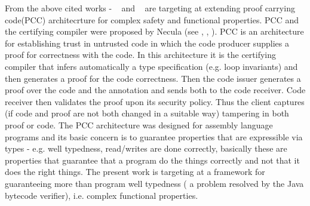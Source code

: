 From the above cited works - ~\cite{WildmoserN-ESOP05} and ~\cite{BM05plb} are targeting at extending proof carrying code(PCC) architecrture for complex safety and functional properties. PCC and the certifying compiler were proposed by Necula (see \cite{Necula97}, \cite{ComNec}, \cite{DesNecLee98}). PCC is an architecture for establishing trust in untrusted code in which the code producer supplies a proof for correctness with the code. In this architecture it is the certifying compiler that infers automatically a type specification (e.g. loop invariants) and then generates a proof for the code correctness. Then the code issuer generates a proof over the code and the annotation and sends both to the code receiver. Code receiver then validates the proof upon its security policy. Thus the client captures (if code and proof are not both changed in a suitable way) tampering in both proof or code. The PCC architecture was designed for assembly language programs and its basic concern is to guarantee properties that are expressible via types - e.g. well typedness, read/writes are done correctly, basically these are properties that guarantee that a program do the things correctly and not that it does the right things. The present work is targeting at a framework for guaranteeing more than program well typedness ( a problem resolved by the Java bytecode verifier), i.e. complex functional properties. 
